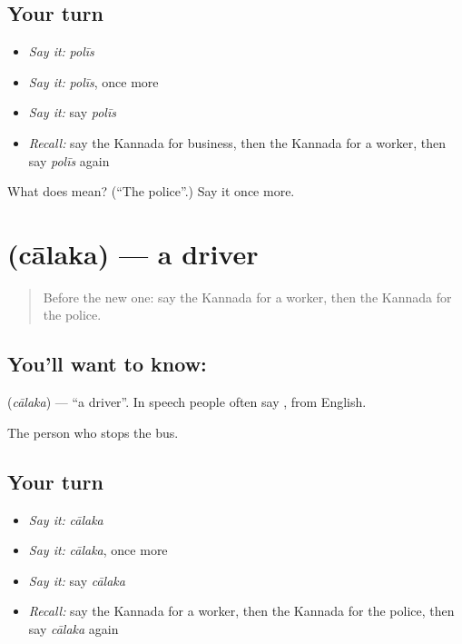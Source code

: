 \subsection*{Your turn}
\begin{itemize}
\raggedright
  \item \emph{Say it:} \emph{polīs}
  \item \emph{Say it:} \emph{polīs}, once more
  \item \emph{Say it:} say \emph{polīs}
  \item \emph{Recall:} say the Kannada for business, then the Kannada for a worker, then say \emph{polīs} again
\end{itemize}

\begin{tcolorbox}[breakable,colback=teal!4,colframe=teal!35!black,title={Before you move on}]
What does  mean? (\textquotedblleft{}The police\textquotedblright{}.) Say it once more.
\end{tcolorbox}
\section[\texorpdfstring{\kn{ಚಾಲಕ} (cālaka)}{ಚಾಲಕ (cālaka)}]{ (cālaka) — a driver}

\label{lesson:KA-C104-driver}



\begin{quote}
Before the new one: say the Kannada for a worker, then the Kannada for the police.
\end{quote}

\subsection*{You'll want to know: }
\textbf{} (\emph{cālaka}) — \textquotedblleft{}a driver\textquotedblright{}. In speech people often say \textbf{}, from English.

\begin{grammarlens}[title={What you've built}]
The person who stops the bus.
\end{grammarlens}

\subsection*{Your turn}
\begin{itemize}
\raggedright
  \item \emph{Say it:} \emph{cālaka}
  \item \emph{Say it:} \emph{cālaka}, once more
  \item \emph{Say it:} say \emph{cālaka}
  \item \emph{Recall:} say the Kannada for a worker, then the Kannada for the police, then say \emph{cālaka} again
\end{itemize}

